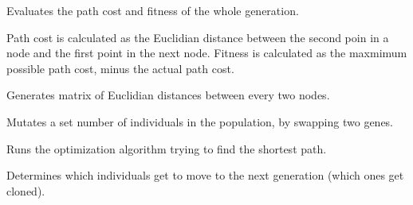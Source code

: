 \documentclass[letterpaper,10pt,english,openany,oneside]{sphinxmanual}
\begin{document}
\begin{fulllineitems}
\begin{fulllineitems}
\label{\detokenize{reference:cnc.optimization.GeneticAlgorithm.evaluate_generation}}
Evaluates the path cost and fitness of the whole generation.

Path cost is calculated as the Euclidian distance between the second
poin in a node and the first point in the next node. Fitness is
calculated as the maxmimum possible path cost, minus the actual path
cost.

\end{fulllineitems}


\begin{fulllineitems}
\label{\detokenize{reference:cnc.optimization.GeneticAlgorithm.generate_distance_matrix}}
Generates matrix of Euclidian distances between every two nodes.

\end{fulllineitems}


\begin{fulllineitems}
\label{\detokenize{reference:cnc.optimization.GeneticAlgorithm.mutation}}
Mutates a set number of individuals in the population, by swapping two
genes.

\end{fulllineitems}


\begin{fulllineitems}
\label{\detokenize{reference:cnc.optimization.GeneticAlgorithm.optimize}}
Runs the optimization algorithm trying to find the shortest path.

\end{fulllineitems}


\begin{fulllineitems}
\label{\detokenize{reference:cnc.optimization.GeneticAlgorithm.reproduction}}
Determines which individuals get to move to the next generation (which
ones get cloned).

\end{fulllineitems}


\end{fulllineitems}
\end{document}
